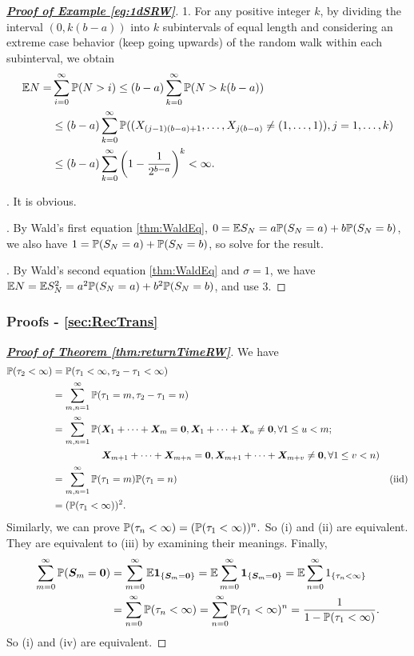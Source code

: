 \documentclass[10pt,a4paper]{article}
\begin{document}
\begin{proof}[\underline{\textbf{Proof of Example \ref{eg:1dSRW}}}]
	1. For any positive integer $k$, by dividing the interval $(0,k(b-a))$ into $k$ subintervals of
	equal length and considering an extreme case behavior (keep going upwards) of the random
	walk within each subinterval, we obtain
	\begin{align*}
		\mathbb E N = &\sum_{i=0}^{\infty }\mathbb P(N>i) \leq (b-a)\sum_{k=0}^{\infty }\mathbb P(N>k(b-a)) \\
		&\leq (b-a)\sum_{k=0}^{\infty } \mathbb P((X_{(j-1)(b-a)+1},\ldots,X_{j(b-a)}\neq (1,\ldots,1)), j=1,\ldots,k) \\
		&\leq (b-a)\sum_{k=0}^{\infty } \left( {1-\frac{1}{2^{b-a}}}\right)^k<\infty. 
	\end{align*}

	. It is obvious.

	. By Wald's first equation \ref{thm:WaldEq}, $0=\mathbb E S_N = a\mathbb P(S_N=a)+b\mathbb P(S_N=b)$, we also have $1=\mathbb P(S_N=a)+\mathbb P(S_N=b)$, so solve for the result.
	
	. By Wald's second equation \ref{thm:WaldEq} and $\sigma=1$, we have $\mathbb E N=\mathbb E S_N^2 = a^2 \mathbb P(S_N=a) + b^2 \mathbb P (S_N=b)$, and use 3.  
\end{proof}

\subsubsection{Proofs - \ref{sec:RecTrans}}\label{sec:proof-RecTrans}
\begin{proof}[\underline{\textbf{Proof of Theorem \ref{thm:returnTimeRW}}}] We have
	\begin{align*} 
		\mathbb P(\tau_{2}<\infty)& =\mathbb P(\tau_{1}<\infty,\tau_{2}-\tau_{1}<\infty) \\
		&=\sum_{m,n=1}^\infty \mathbb P(\tau_1=m,\tau_2-\tau_1=n) \\
		&= \sum_{m,n=1}^\infty \mathbb P({\boldsymbol X}_1+\cdots+{\boldsymbol X}_m={\boldsymbol 0},{\boldsymbol X}_1+\cdots+{\boldsymbol X}_u\neq{\boldsymbol 0},\forall 1\leq u<m; \\
		&\qquad \qquad \quad {\boldsymbol X}_{m+1}+\cdots+{\boldsymbol X}_{m+n}={\boldsymbol 0},{\boldsymbol X}_{m+1}+\cdots+{\boldsymbol X}_{m+v}\neq{\boldsymbol 0},\forall 1\leq v<n) \\
		&=\sum_{m,n=1}^\infty \mathbb P(\tau_1=m)\mathbb P(\tau_1=n) & (\text{iid}) \\
		&=(\mathbb P(\tau_1<\infty ))^2.
	\end{align*} 
	Similarly, we can prove $\mathbb P(\tau_n<\infty)=(\mathbb P(\tau_1<\infty))^n.$ So (i) and (ii) are equivalent. They are equivalent to (iii) by examining their meanings. Finally, 
	\begin{align*}
		\sum_{m=0}^{\infty}\mathbb P({\boldsymbol S}_{m}={\boldsymbol 0})& =\sum_{m=0}^{\infty}\mathbb E{\boldsymbol 1}_{\{{\boldsymbol S}_{m}={\boldsymbol 0}\}}=\mathbb E\sum_{m=0}^{\infty}{\boldsymbol 1}_{\{{\boldsymbol S}_{m}={\boldsymbol 0}\}} 
		=\mathbb E\sum_{n=0}^\infty1_{\{\tau_n<\infty\}} \\
		&=\sum_{n=0}^\infty \mathbb P(\tau_n<\infty)=\sum_{n=0}^\infty\mathbb P(\tau_1<\infty)^n=\frac{1}{1-\mathbb P(\tau_1<\infty )}.
	\end{align*} 
	So (i) and (iv) are equivalent.
\end{proof}
\end{document}
